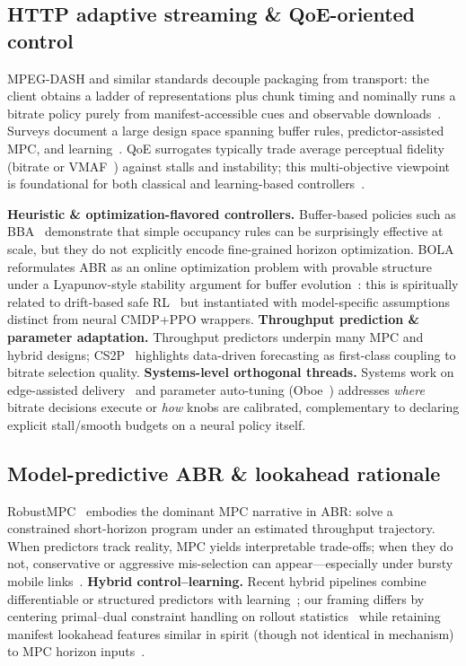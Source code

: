 \documentclass[preprint,12pt]{elsarticle}
\begin{document}
\subsection{HTTP adaptive streaming \& QoE-oriented control}

MPEG-DASH and similar standards decouple packaging from transport: the client obtains a ladder of representations plus chunk timing and nominally runs a bitrate policy purely from manifest-accessible cues and observable downloads~\cite{sodagar2011mpeg}.
Surveys document a large design space spanning buffer rules, predictor-assisted MPC, and learning~\cite{bentaleb2018survey,wu2024qoe}.
QoE surrogates typically trade average perceptual fidelity (bitrate or VMAF~\cite{li2016vmaf}) against stalls and instability; this multi-objective viewpoint is foundational for both classical and learning-based controllers~\cite{wu2024qoe}.

\textbf{Heuristic \& optimization-flavored controllers.}
Buffer-based policies such as BBA~\cite{huang2014buffer} demonstrate that simple occupancy rules can be surprisingly effective at scale, but they do not explicitly encode fine-grained horizon optimization.
BOLA reformulates ABR as an online optimization problem with provable structure under a Lyapunov-style stability argument for buffer evolution~\cite{spiteri2018bola}: this is spiritually related to drift-based safe RL~\cite{chow2018lyapunov} but instantiated with model-specific assumptions distinct from neural CMDP+PPO wrappers.
\textbf{Throughput prediction \& parameter adaptation.}
Throughput predictors underpin many MPC and hybrid designs; CS2P~\cite{sun2016cs2p} highlights data-driven forecasting as first-class coupling to bitrate selection quality.
\textbf{Systems-level orthogonal threads.}
Systems work on edge-assisted delivery~\cite{mehrabi2019edge,kim2023http,kang2023adaptive} and parameter auto-tuning (Oboe~\cite{akhtar2018oboe}) addresses \emph{where} bitrate decisions execute or \emph{how} knobs are calibrated, complementary to declaring explicit stall/smooth budgets on a neural policy itself.

\subsection{Model-predictive ABR \& lookahead rationale}

RobustMPC~\cite{yin2015control} embodies the dominant MPC narrative in ABR: solve a constrained short-horizon program under an estimated throughput trajectory.
When predictors track reality, MPC yields interpretable trade-offs; when they do not, conservative or aggressive mis-selection can appear---especially under bursty mobile links~\cite{kvalbein2014,sun2016cs2p}.
\textbf{Hybrid control--learning.}
Recent hybrid pipelines combine differentiable or structured predictors with learning~\cite{liu2023hybrid}; our framing differs by centering primal--dual constraint handling on rollout statistics~\cite{paternain2019dual} while retaining manifest lookahead features similar in spirit (though not identical in mechanism) to MPC horizon inputs~\cite{yin2015control}.
\end{document}
